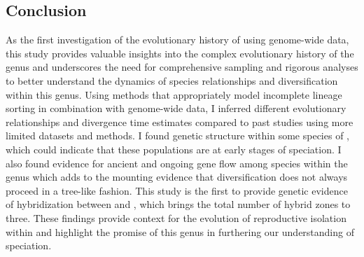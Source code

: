 \subsection{Conclusion}
As the first investigation of the evolutionary history of \anaxyrus using genome-wide 
data, this study provides
valuable insights into the complex evolutionary history 
of the genus and underscores the need for comprehensive sampling and 
rigorous analyses to better understand the dynamics of species relationships and 
diversification within this genus.
Using methods that appropriately model incomplete lineage sorting in combination
with genome-wide data, I inferred different evolutionary relationships and
divergence time estimates compared to past studies using more limited 
datasets and methods.
I found genetic structure within some species of \anaxyrus, which could indicate
that these populations are at early stages of speciation.
I also found evidence for ancient and ongoing gene flow among species within
the genus which adds to the mounting evidence that diversification does not always
proceed in a tree-like fashion. 
This study is the first to provide genetic evidence of hybridization between
\fowl and \wood, which brings the total number of \anaxyrus hybrid zones to three.
These findings provide context for the evolution of reproductive isolation 
within \anaxyrus and highlight the promise of this genus in furthering our understanding of speciation.